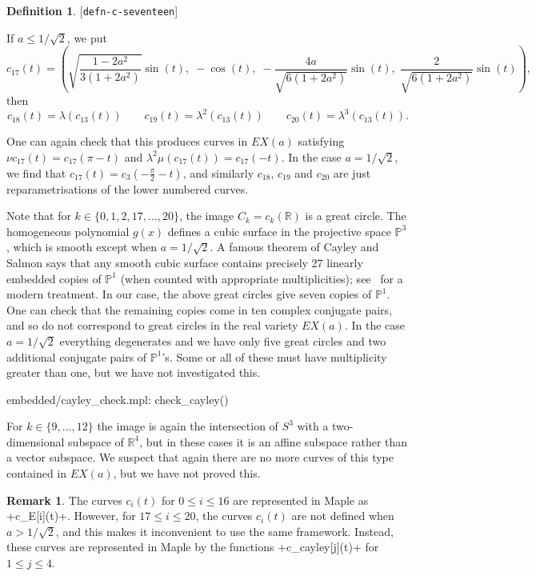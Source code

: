 \documentclass[reqno]{amsart}
\newcommand{\lbl}[1]{\label{#1}\textup{[\texttt{#1}]}\par}
\newcommand{\lbl}{\label}
\newcommand{\lm}        {\lambda}
\newcommand{\R}         {{\mathbb{R}}}
\newcommand{\rt}        {\sqrt{2}}
\renewcommand{\:}{\colon}
\theoremstyle{definition}
\newtheorem{remark}[theorem]{Remark}
\newtheorem{definition}[theorem]{Definition}
\begin{document}
\begin{definition}\lbl{defn-c-seventeen}
 If $a\leq 1/\rt$, we put
 \[ c_{17}(t) = \left(
     \sqrt{\frac{1-2a^2}{3(1+2a^2)}}\sin(t),\;
     -\cos(t),\;
     -\frac{4a}{\sqrt{6(1+2a^2)}}\sin(t),\;
     \frac{2}{\sqrt{6(1+2a^2)}}\sin(t)
    \right),
 \]
 then
 \[ c_{18}(t) = \lm(c_{13}(t)) \qquad
    c_{19}(t) = \lm^2(c_{13}(t)) \qquad
    c_{20}(t) = \lm^3(c_{13}(t)).
 \]
\end{definition}
One can again check that this produces curves in $EX(a)$ satisfying
$\nu c_{17}(t)=c_{17}(\pi-t)$ and $\lm^2\mu(c_{17}(t))=c_{17}(-t)$.
In the case $a=1/\rt$, we find that
$c_{17}(t)=c_3(-\tfrac{\pi}{2}-t)$, and similarly $c_{18}$, $c_{19}$
and $c_{20}$ are just reparametrisations of the lower numbered curves.

Note that for $k\in\{0,1,2,17,\dotsc,20\}$, the image $C_k=c_k(\R)$ is
a great circle.  The homogeneous polynomial $g(x)$ defines a cubic
surface in the projective space $\mathbb{P}^3$, which is smooth except
when $a=1/\rt$.  A famous theorem of Cayley and Salmon says that any
smooth cubic surface contains precisely 27 linearly embedded copies of
$\mathbb{P}^1$ (when counted with appropriate multiplicities);
see~\cite[Theorem 9.1.13]{do:cag} for a modern treatment.  In our
case, the above great circles give seven copies of $\mathbb{P}^1$.
One can check that the remaining copies come in ten complex conjugate
pairs, and so do not correspond to great circles in the real variety
$EX(a)$.  In the case $a=1/\rt$ everything degenerates and we have
only five great circles and two additional conjugate pairs of
$\mathbb{P}^1$'s.  Some or all of these must have multiplicity greater
than one, but we have not investigated this.
\begin{checks}
 embedded/cayley_check.mpl: check_cayley()
\end{checks}

For $k\in\{9,\dotsc,12\}$ the image is again the intersection of $S^3$
with a two-dimensional subspace of $\R^4$, but in these cases it is an
affine subspace rather than a vector subspace.  We suspect that again
there are no more curves of this type contained in $EX(a)$, but we
have not proved this.

\begin{remark}
 The curves $c_i(t)$ for $0\leq i\leq 16$ are represented in Maple as
 \mcode+c_E[i](t)+.  However, for $17\leq i\leq 20$, the curves
 $c_i(t)$ are not defined when $a>1/\rt$, and this makes it
 inconvenient to use the same framework.  Instead, these curves are
 represented in Maple by the functions \mcode+c_cayley[j](t)+ for
 $1\leq j\leq 4$.
\end{remark}
\end{document}
